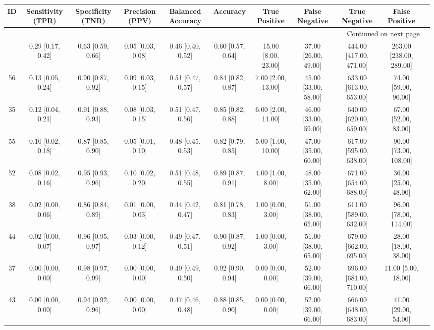 \documentclass[8pt]{article}
\begin{document}
\begin{center}
\begin{footnotesize}
\begin{longtable}{|ccccccccccc|}
\toprule
 ID &  Sensitivity (TPR) &  Specificity (TNR) &    Precision (PPV) &  Balanced Accuracy &           Accuracy &        True Positive &        False Negative &            True Negative &           False Positive \\
\midrule
\endhead
\midrule
\multicolumn{10}{r}{{Continued on next page}} \\
\midrule
\endfoot

\bottomrule
\endlastfoot
 33 &  0.29 [0.17, 0.42] &  0.63 [0.59, 0.66] &  0.05 [0.03, 0.08] &  0.46 [0.40, 0.52] &  0.60 [0.57, 0.64] &  15.00 [8.00, 23.00] &  37.00 [26.00, 49.00] &  444.00 [417.00, 471.00] &  263.00 [238.00, 289.00] \\
 56 &  0.13 [0.05, 0.24] &  0.90 [0.87, 0.92] &  0.09 [0.03, 0.15] &  0.51 [0.47, 0.57] &  0.84 [0.82, 0.87] &   7.00 [2.00, 13.00] &  45.00 [33.00, 58.00] &  633.00 [613.00, 653.00] &     74.00 [59.00, 90.00] \\
 35 &  0.12 [0.04, 0.21] &  0.91 [0.88, 0.93] &  0.08 [0.03, 0.15] &  0.51 [0.47, 0.56] &  0.85 [0.82, 0.88] &   6.00 [2.00, 11.00] &  46.00 [33.00, 59.00] &  640.00 [620.00, 659.00] &     67.00 [52.00, 83.00] \\
 55 &  0.10 [0.02, 0.18] &  0.87 [0.85, 0.90] &  0.05 [0.01, 0.10] &  0.48 [0.45, 0.53] &  0.82 [0.79, 0.85] &   5.00 [1.00, 10.00] &  47.00 [35.00, 60.00] &  617.00 [595.00, 638.00] &    90.00 [73.00, 108.00] \\
 52 &  0.08 [0.02, 0.16] &  0.95 [0.93, 0.96] &  0.10 [0.02, 0.20] &  0.51 [0.48, 0.55] &  0.89 [0.87, 0.91] &    4.00 [1.00, 8.00] &  48.00 [35.00, 62.00] &  671.00 [654.00, 688.00] &     36.00 [25.00, 48.00] \\
 38 &  0.02 [0.00, 0.06] &  0.86 [0.84, 0.89] &  0.01 [0.00, 0.03] &  0.44 [0.42, 0.47] &  0.81 [0.78, 0.83] &    1.00 [0.00, 3.00] &  51.00 [38.00, 65.00] &  611.00 [589.00, 632.00] &    96.00 [78.00, 114.00] \\
 44 &  0.02 [0.00, 0.07] &  0.96 [0.95, 0.97] &  0.03 [0.00, 0.12] &  0.49 [0.47, 0.51] &  0.90 [0.87, 0.92] &    1.00 [0.00, 3.00] &  51.00 [38.00, 65.00] &  679.00 [662.00, 695.00] &     28.00 [18.00, 38.00] \\
 37 &  0.00 [0.00, 0.00] &  0.98 [0.97, 0.99] &  0.00 [0.00, 0.00] &  0.49 [0.49, 0.50] &  0.92 [0.90, 0.94] &    0.00 [0.00, 0.00] &  52.00 [39.00, 66.00] &  696.00 [681.00, 710.00] &      11.00 [5.00, 18.00] \\
 43 &  0.00 [0.00, 0.00] &  0.94 [0.92, 0.96] &  0.00 [0.00, 0.00] &  0.47 [0.46, 0.48] &  0.88 [0.85, 0.90] &    0.00 [0.00, 0.00] &  52.00 [39.00, 66.00] &  666.00 [648.00, 683.00] &     41.00 [29.00, 54.00] \\
\end{longtable}
\end{footnotesize}
\end{center}
\end{document}

